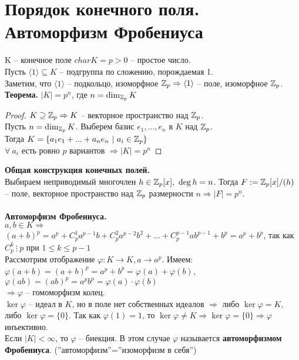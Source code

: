 \section{Порядок конечного поля. Автоморфизм Фробениуса}

K -- конечное поле $char{K}=p>0$ -- простое число.\\
Пусть $\langle 1\rangle \subseteq K$ -- подгруппа по сложению, порождаемая 1.\\
Заметим, что $\langle 1\rangle$ -- подкольцо, изоморфное $\mathbb{Z}_p\Rightarrow \langle 1\rangle$ -- поле, изоморфное $\mathbb{Z}_p$.\\
\textbf{Теорема.} $|K|=p^n$, где $n=\dim_{\mathbb{Z}_p}K$
\begin{proof}
    $K\supseteq \mathbb{Z}_p\Rightarrow K$ -- векторное пространство над $\mathbb{Z}_p$.\\
    Пусть $n=\dim_{\mathbb{Z}_p}K$. Выберем базис $e_1,...,e_n$ в $K$ над $\mathbb{Z}_p$.\\
    Тогда $K=\{ a_1e_1+...+a_ne_n \ | \ a_i\in \mathbb{Z}_p\}$\\
    $\forall \ a_i$ есть ровно $p$ вариантов $\Rightarrow |K|=p^n$
\end{proof}
\noindent \textbf{Общая конструкция конечных полей.}\\
Выбираем неприводимый многочлен $h\in \mathbb{Z}_p[x], \ \deg{h}=n$. Тогда $F:=\mathbb{Z}_p[x]/(h)$ -- поле, векторное пространство над $\mathbb{Z}_p$ размерности $n\Rightarrow |F|=p^n$.\\\\
\textbf{Автоморфизм Фробениуса.}\\
$a,b\in K\Rightarrow $\\
$(a+b)^p=a^p+C_p^1a^{p-1}b+C_p^2a^{p-2}b^2+...+C_p^{p-1}ab^{p-1}+b^p=a^p+b^p$, так как $C_p^k\ \vdots\ p$ при $1\leqslant k\leqslant p-1$\\
Рассмотрим отображение $\varphi: K\to K, a\to a^p$. Имеем:\\
$\varphi(a+b)=(a+b)^p=a^p+b^p=\varphi(a)+\varphi(b)$,\\
$\varphi(ab)=(ab)^p=a^pb^p=\varphi(a)\cdot\varphi(b)$\\
$\Rightarrow \varphi$ -- гомоморфизм колец.\\
$\ker\varphi$ -- идеал в $K$, но в поле нет собственных идеалов $\Rightarrow $ либо $\ker\varphi=K$, либо $\ker\varphi=\{0\}$. Так как $\varphi(1)=1$, то $\ker\varphi\neq K\Rightarrow \ker\varphi=\{0\}\Rightarrow\varphi$ инъективно.\\
Если $|K|<\infty$, то $\varphi$ -- биекция. В этом случае $\varphi$ называется \textbf{автоморфизмом Фробениуса}. (''автоморфизм''=''изоморфизм в себя'')
